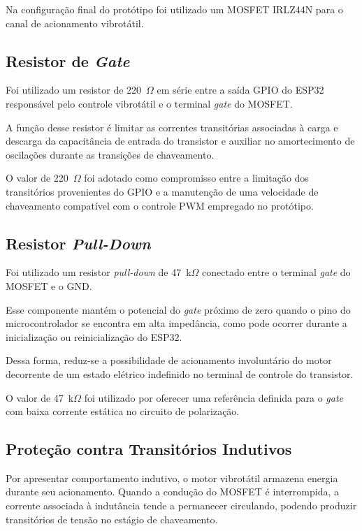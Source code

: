 Na configuração final do protótipo foi utilizado um MOSFET IRLZ44N para o canal de acionamento vibrotátil.

\subsection{Resistor de \textit{Gate}}
\label{sec:resistor_gate}

Foi utilizado um resistor de 220~$\Omega$ em série entre a saída GPIO do ESP32 responsável pelo controle vibrotátil e o terminal \textit{gate} do MOSFET.

A função desse resistor é limitar as correntes transitórias associadas à carga e descarga da capacitância de entrada do transistor e auxiliar no amortecimento de oscilações durante as transições de chaveamento.

O valor de 220~$\Omega$ foi adotado como compromisso entre a limitação dos transitórios provenientes do GPIO e a manutenção de uma velocidade de chaveamento compatível com o controle PWM empregado no protótipo.

\subsection{Resistor \textit{Pull-Down}}
\label{sec:pull_down}


Foi utilizado um resistor \textit{pull-down} de 47~k$\Omega$ conectado entre o terminal \textit{gate} do MOSFET e o GND.

Esse componente mantém o potencial do \textit{gate} próximo de zero quando o pino do microcontrolador se encontra em alta impedância, como pode ocorrer durante a inicialização ou reinicialização do ESP32.

Dessa forma, reduz-se a possibilidade de acionamento involuntário do motor decorrente de um estado elétrico indefinido no terminal de controle do transistor.

O valor de 47~k$\Omega$ foi utilizado por oferecer uma referência definida para o \textit{gate} com baixa corrente estática no circuito de polarização.

\subsection{Proteção contra Transitórios Indutivos}
\label{sec:protecao_flyback}


Por apresentar comportamento indutivo, o motor vibrotátil armazena energia durante seu acionamento. Quando a condução do MOSFET é interrompida, a corrente associada à indutância tende a permanecer circulando, podendo produzir transitórios de tensão no estágio de chaveamento.

